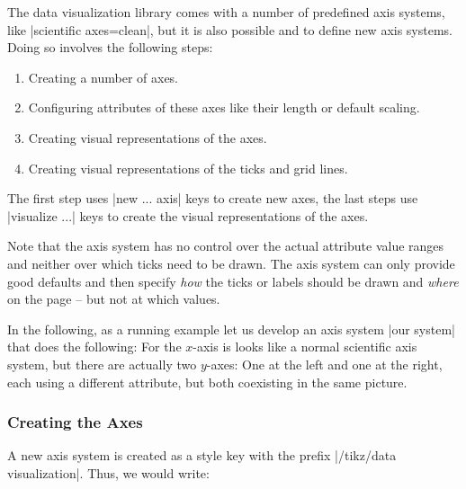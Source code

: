 The data visualization library comes with a number of predefined axis systems,
like |scientific axes=clean|, but it is also possible and to define new axis
systems. Doing so involves the following steps:
%
\begin{enumerate}
    \item Creating a number of axes.
    \item Configuring attributes of these axes like their length or default
        scaling.
    \item Creating visual representations of the axes.
    \item Creating visual representations of the ticks and grid lines.
\end{enumerate}

The first step uses |new ... axis| keys to create new axes, the last steps use
|visualize ...| keys to create the visual representations of the axes.

Note that the axis system has no control over the actual attribute value ranges
and neither over which ticks need to be drawn. The axis system can only provide
good defaults and then specify \emph{how} the ticks or labels should be drawn
and \emph{where} on the page -- but not at which values.

In the following, as a running example let us develop an axis system
|our system| that does the following: For the $x$-axis is looks like a normal
scientific axis system, but there are actually two $y$-axes: One at the left
and one at the right, each using a different attribute, but both coexisting in
the same picture.


\subsubsection{Creating the Axes}

A new axis system is created as a style key with the prefix
|/tikz/data visualization|. Thus, we would write:
%
\begin{codeexample}
\end{codeexample}

